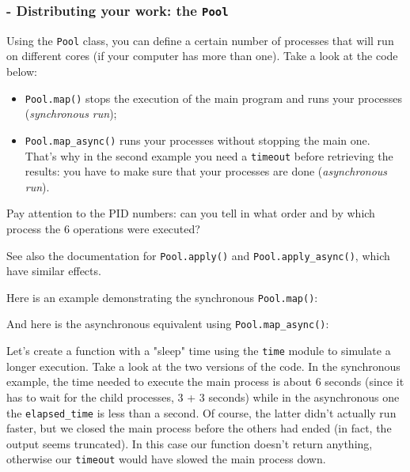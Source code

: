 

\subsubsection{- Distributing your work: the \texttt{Pool}}

Using the \texttt{Pool} class, you can define a certain number of processes that will run on different cores (if your computer has more than one). Take a look at the code below:
\begin{itemize}
    \item[-] \texttt{Pool.map()} stops the execution of the main program and runs your processes (\textit{synchronous run});
    \item[-] \texttt{Pool.map\_async()} runs your processes without stopping the main one. That's why in the second example you need a \texttt{timeout} before retrieving the results: you have to make sure that your processes are done (\textit{asynchronous run}). 
\end{itemize}
Pay attention to the PID numbers: can you tell in what order and by which process the 6 operations were executed? 

See also the documentation for  \texttt{Pool.apply()} and \texttt{Pool.apply\_async()}, which have similar effects. 

Here is an example demonstrating the synchronous \texttt{Pool.map()}:


\bigskip
\hrulefill
\bigskip

And here is the asynchronous equivalent using \texttt{Pool.map\_async()}:



Let's create a function with a "sleep" time using the \texttt{time} module to simulate a longer execution. Take a look at the two versions of the code. In the synchronous example, the time needed to execute the main process is about 6 seconds (since it has to wait for the child processes, 3 + 3 seconds) while in the asynchronous one the \texttt{elapsed\_time} is less than a second. Of course, the latter didn't actually run faster, but we closed the main process before the others had ended (in fact, the output seems truncated). In this case our function doesn't return anything, otherwise our \texttt{timeout} would have slowed the main process down. 


\bigskip
\hrulefill
\bigskip



